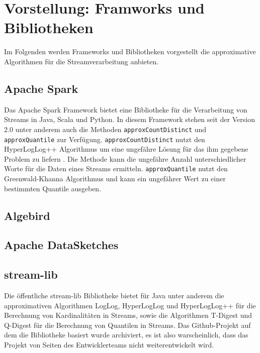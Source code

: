 \section{Vorstellung: Framworks und Bibliotheken}
Im Folgenden werden Frameworks und Bibliotheken vorgestellt die approximative Algorithmen für die Streamverarbeitung anbieten. 

\subsection{Apache Spark}
Das Apache Spark Framework bietet eine Bibliotheke für die Verarbeitung von Streams in Java, Scala und Python. 
In diesem Framework stehen seit der Version 2.0 unter anderem auch die Methoden \texttt{approxCountDistinct} und \texttt{approxQuantile} zur Verfügung. 
\texttt{approxCountDistinct} nutzt den HyperLogLog++ Algorithmus um eine ungefähre Lösung für das ihm gegebene Problem zu liefern \cite{hunter2016}.
Die Methode kann die ungefähre Anzahl unterschiedlicher Worte für die Daten eines Streams ermitteln.
\texttt{approxQuantile} nutzt den Greenwald-Khanna Algorithmus \cite{greenwald2001} und kann ein ungefährer Wert zu einer bestimmten Quantile ausgeben.




\subsection{Algebird}


\subsection{Apache DataSketches}


\subsection{stream-lib}
Die öffentliche stream-lib Bibliotheke bietet für Java unter anderem die approximativen Algorithmen LogLog, 
HyperLogLog und HyperLogLog++ für die Berechnung von Kardinalitäten in Streams, 
sowie die Algorithmen T-Digest und Q-Digest für die Berechnung von Quantilen in Streams. 
Das Github-Projekt auf dem die Bibliotheke basiert wurde archiviert, es ist also warscheinlich, dass das Projekt von Seiten des Entwicklerteams nicht weiterentwickelt wird. 
